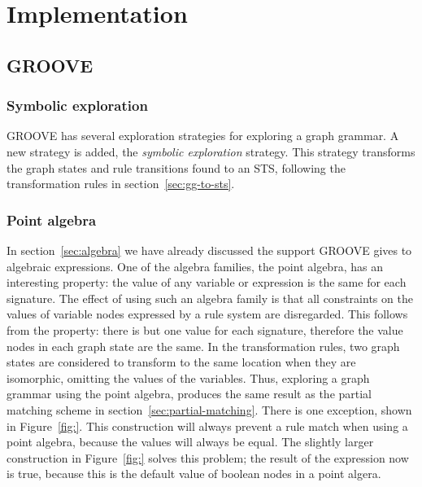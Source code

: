 \section{Implementation}\label{sec:implementation}

\subsection{GROOVE}

\subsubsection{Symbolic exploration}
GROOVE has several exploration strategies for exploring a graph grammar. A new strategy is added, the \textit{symbolic exploration} strategy. This strategy transforms the graph states and rule transitions found to an STS, following the transformation rules in section~\ref{sec:gg-to-sts}.

\subsubsection{Point algebra}
In section~\ref{sec:algebra} we have already discussed the support GROOVE gives to algebraic expressions. One of the algebra families, the point algebra, has an interesting property: the value of any variable or expression is the same for each signature. The effect of using such an algebra family is that all constraints on the values of variable nodes expressed by a rule system are disregarded. This follows from the property: there is but one value for each signature, therefore the value nodes in each graph state are the same. In the transformation rules, two graph states are considered to transform to the same location when they are isomorphic, omitting the values of the variables. Thus, exploring a graph grammar using the point algebra, produces the same result as the partial matching scheme in section~\ref{sec:partial-matching}. There is one exception, shown in Figure~\ref{fig:}. This construction will always prevent a rule match when using a point algebra, because the values will always be equal. The slightly larger construction in Figure~\ref{fig:} solves this problem; the result of the expression now is true, because this is the default value of boolean nodes in a point algera.

